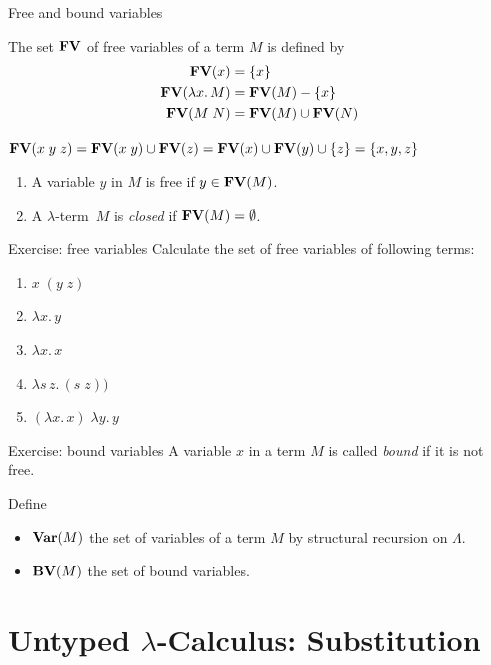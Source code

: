 \begin{frame}{Free and bound variables}
\begin{definition}
  The set $\mathbf{FV}$ of free variables of a term $M$ is defined by
  \begin{align*}
    \mathbf{FV}(x) & = \{x\} \\
    \mathbf{FV}(\lambda x.\, M) & = \mathbf{FV}(M) - \{x\} \\
    \mathbf{FV}(M\;N) & = \mathbf{FV}(M) \cup \mathbf{FV}(N)
  \end{align*}
\end{definition}
$\mathbf{FV}(x\;y\;z) = \mathbf{FV}(x\;y) \cup \mathbf{FV}(z) = \mathbf{FV}(x) \cup \mathbf{FV}(y) \cup \{z\} = \{x, y, z\}$
\begin{definition}
  \begin{enumerate}
    \item A variable $y$ in $M$ is \alert{free} if $y \in \mathbf{FV}(M)$.
    \item A $\lambda$-term~$M$ is \alert{\emph{closed}} if $\mathbf{FV}(M) = \emptyset$. 
  \end{enumerate}
\end{definition}

\end{frame}

\begin{frame}{Exercise: free variables}
  Calculate the set of free variables of following terms:
  \begin{enumerate}
    \item $x\;(y\; z) $
    \item $\lambda x.\, y$
    \item $\lambda x.\, x$
    \item $\lambda s\,z.\, (s \;z))$
    \item $(\lambda x.\, x)\;\lambda y.\, y$
  \end{enumerate}
\end{frame}

\begin{frame}{Exercise: bound variables}
  A variable $x$ in a term $M$ is called \emph{bound} if it is not free.

  Define
  \begin{itemize}
    \item $\mathbf{Var}(M)$ the set of variables of a term $M$ by structural recursion on $\Lambda$.
    \item $\mathbf{BV}(M)$ the set of bound variables.
  \end{itemize}
\end{frame}

\section{Untyped $\lambda$-Calculus: Substitution}

